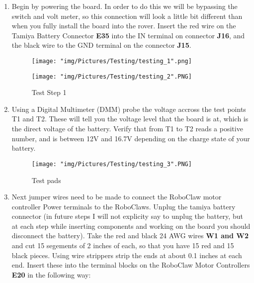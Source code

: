 \documentclass[12pt]{article}
\begin{document}
\begin{enumerate}

\item Begin by powering the board. In order to do this we will be bypassing the switch and volt meter, so this connection will look a little bit different than when you fully install the board into the rover. Insert the red wire on the Tamiya Battery Connector \textbf{E35} into the IN terminal on connector \textbf{J16}, and the black wire to the GND terminal on the connector \textbf{J15}.

\begin{figure}[H]
  \centering
  \begin{minipage}[b]{0.45\textwidth}
    \texttt{[image: "img/Pictures/Testing/testing\_1".png]}
  \end{minipage}
  \hfill
  \begin{minipage}[b]{0.45\textwidth}
    \texttt{[image: "img/Pictures/Testing/testing\_2".PNG]}
  \end{minipage}
  \caption{Test Step 1}
  \label{test_1}
\end{figure}

\item Using a Digital Multimeter (DMM) probe the voltage accross the test points T1 and T2. These will tell you the voltage level that the board is at, which is the direct voltage of the battery. Verify that from T1 to T2 reads a positive number, and is between 12V and 16.7V depending on the charge state of your battery. 

\begin{figure}[H]
  \centering
    \texttt{[image: "img/Pictures/Testing/testing\_3".PNG]}
  \caption{Test pads}
  \label{test_pads_1}
\end{figure}

\item Next jumper wires need to be made to connect the RoboClaw motor controller Power terminals to the RoboClaws. Unplug the tamiya battery connector (in future steps I will not explicity say to unplug the battery, but at each step while inserting components and working on the board you should disconnect the battery). Take the red and black 24 AWG wires \textbf{W1 and W2} and cut 15 segements of 2 inches of each, so that you have 15 red and 15 black pieces. Using wire strippers strip the ends at about 0.1 inches at each end. Insert these into the terminal blocks on the RoboClaw Motor Controllers \textbf{E20} in the following way:


\end{enumerate}
\end{document}
